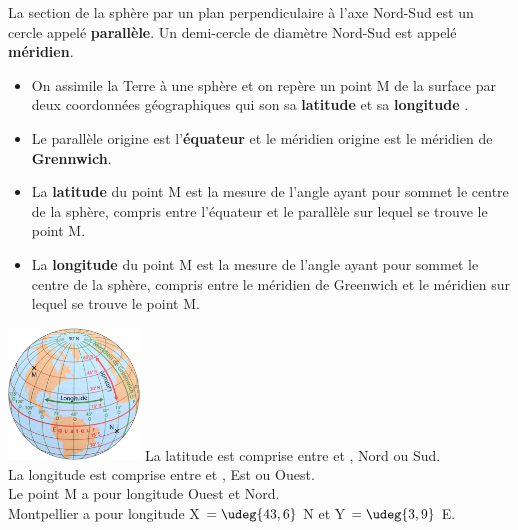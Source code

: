 \begin{definition}
   La section de la sphère par un plan perpendiculaire à l'axe Nord-Sud est un cercle appelé {\bf parallèle}. Un demi-cercle de diamètre Nord-Sud est appelé {\bf méridien}.
\end{definition}

\smallskip

\begin{definition}
   \begin{itemize}
      \item On assimile la Terre à une sphère et on repère un point M de la surface par deux coordonnées géographiques  qui son sa {\bf latitude} et sa {\bf longitude} .
      \item Le parallèle origine est l'{\bf équateur} et le méridien origine est le méridien de {\bf Grennwich}.
      \item La {\bf latitude} du point M est la mesure de l'angle ayant pour sommet le centre de la sphère, compris entre l'équateur et le parallèle sur lequel se trouve le point M.
       \item La {\bf longitude} du point M est la mesure de l'angle ayant pour sommet le centre de la sphère, compris entre le méridien de Greenwich et le méridien sur lequel se trouve le point M. \\ [-8mm]
    \end{itemize}     
\end{definition}

\smallskip

\begin{exemple}
   \vspace*{-3mm} \hspace*{15mm} \includegraphics[width=3.5cm]{Geometrie/Images/G12_cours_rep_Terre}
   \correction
      La latitude est comprise entre  et , Nord ou Sud. \\
      La longitude est comprise entre  et , Est ou Ouest. \\ [3mm]
      Le point M a pour longitude  Ouest et  Nord. \\
      Montpellier a pour longitude X $=\udeg{43,6}$ N et Y $=\udeg{3,9}$ E.
\end{exemple}



